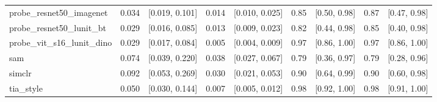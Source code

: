 \begin{tabular}{lrrrrrrrr}
probe\_resnet50\_imagenet & 0.034 & [0.019, 0.101] & 0.014 & [0.010, 0.025] & 0.85 & [0.50, 0.98] & 0.87 & [0.47, 0.98] \\
probe\_resnet50\_lunit\_bt & 0.029 & [0.016, 0.085] & 0.013 & [0.009, 0.023] & 0.82 & [0.44, 0.98] & 0.85 & [0.40, 0.98] \\
probe\_vit\_s16\_lunit\_dino & 0.029 & [0.017, 0.084] & 0.005 & [0.004, 0.009] & 0.97 & [0.86, 1.00] & 0.97 & [0.86, 1.00] \\
sam & 0.074 & [0.039, 0.220] & 0.038 & [0.027, 0.067] & 0.79 & [0.36, 0.97] & 0.79 & [0.28, 0.96] \\
simclr & 0.092 & [0.053, 0.269] & 0.030 & [0.021, 0.053] & 0.90 & [0.64, 0.99] & 0.90 & [0.60, 0.98] \\
tia\_style & 0.050 & [0.030, 0.144] & 0.007 & [0.005, 0.012] & 0.98 & [0.92, 1.00] & 0.98 & [0.91, 1.00] \\
\bottomrule
\end{tabular}

